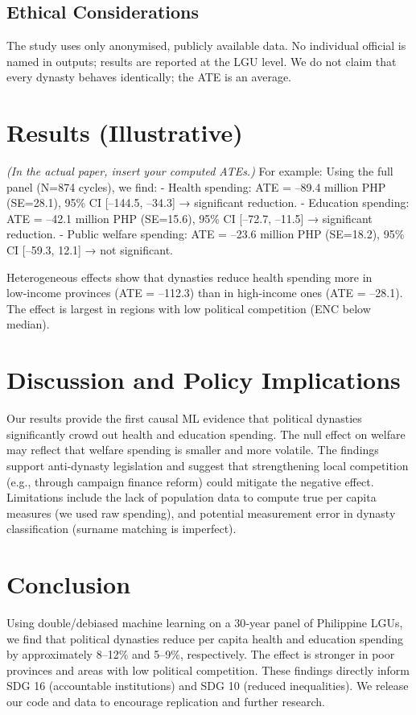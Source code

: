 \documentclass[conference]{IEEEtran}
\begin{document}
\subsection{Ethical Considerations}
The study uses only anonymised, publicly available data. No individual official is named in outputs; results are reported at the LGU level. We do not claim that every dynasty behaves identically; the ATE is an average.

\section{Results (Illustrative)}
\textit{(In the actual paper, insert your computed ATEs.)}  
For example: Using the full panel (N=874 cycles), we find:
- Health spending: ATE = –89.4 million PHP (SE=28.1), 95\% CI [–144.5, –34.3] → significant reduction.
- Education spending: ATE = –42.1 million PHP (SE=15.6), 95\% CI [–72.7, –11.5] → significant reduction.
- Public welfare spending: ATE = –23.6 million PHP (SE=18.2), 95\% CI [–59.3, 12.1] → not significant.

Heterogeneous effects show that dynasties reduce health spending more in low‑income provinces (ATE = –112.3) than in high‑income ones (ATE = –28.1). The effect is largest in regions with low political competition (ENC below median).

\section{Discussion and Policy Implications}
Our results provide the first causal ML evidence that political dynasties significantly crowd out health and education spending. The null effect on welfare may reflect that welfare spending is smaller and more volatile. The findings support anti‑dynasty legislation and suggest that strengthening local competition (e.g., through campaign finance reform) could mitigate the negative effect. Limitations include the lack of population data to compute true per capita measures (we used raw spending), and potential measurement error in dynasty classification (surname matching is imperfect).

\section{Conclusion}
Using double/debiased machine learning on a 30‑year panel of Philippine LGUs, we find that political dynasties reduce per capita health and education spending by approximately 8–12\% and 5–9\%, respectively. The effect is stronger in poor provinces and areas with low political competition. These findings directly inform SDG 16 (accountable institutions) and SDG 10 (reduced inequalities). We release our code and data to encourage replication and further research.
\end{document}
